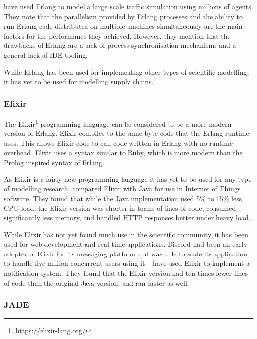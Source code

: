  have used Erlang to model a large scale traffic simulation using millions of agents.
They note that the parallelism provided by Erlang processes and the ability to run Erlang code distributed on multiple machines simultaneously are the main factors for the performance they achieved.
However, they mention that the drawbacks of Erlang are a lack of process synchronisation mechanisms and a general lack of IDE tooling.

While Erlang has been used for implementing other types of scientific modelling, it has yet to be used for modelling supply chains.

\subsubsection{Elixir}

The Elixir\footnote{\url{https://elixir-lang.org/}} programming language can be considered to be a more modern version of Erlang.
Elixir compiles to the same byte code that the Erlang runtime uses.
This allows Elixir code to call code written in Erlang with no runtime overhead.
Elixir uses a syntax similar to Ruby, which is more modern than the Prolog inspired syntax of Erlang.~\cite{loder2016erlang}

As Elixir is a fairly new programming language it has yet to be used for any type of modelling research.
 compared Elixir with Java for use in Internet of Things software.
They found that while the Java implementation used 5\% to 15\% less CPU load, the Elixir version was shorter in terms of lines of code, consumed significantly less memory, and handled HTTP responses better under heavy load.

While Elixir has not yet found much use in the scientific community, it has been used for web development and real-time applications.
Discord had been an early adopter of Elixir for its messaging platform and was able to scale its application to handle five million concurrent users using it.~\cite{vishnevskiy2017discord}
 have used Elixir to implement a notification system.
They found that the Elixir version had ten times fewer lines of code than the original Java version, and ran faster as well.

\subsubsection{JADE}

